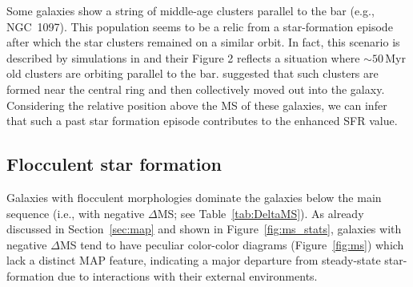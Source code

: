 \documentclass[linenumbers]{aastex63}
\begin{document}
Some galaxies show a string of middle-age clusters parallel to the bar (e.g., NGC~1097). This population seems to be a relic from a star-formation episode after which the star clusters remained on a similar orbit. In fact, this scenario is described by simulations in \citet{dobbs_age_2010} and their Figure 2 reflects a situation where $\sim50$\,Myr old clusters are orbiting parallel to the bar. \citet{sormani_simulations_2020} suggested that such clusters are formed near the central ring and then collectively moved out into the galaxy. %
Considering the relative position above the MS of these galaxies, we can infer that such a past star formation episode contributes to the enhanced SFR value.


\subsection{Flocculent star formation} \label{sect:flocculent}


Galaxies with flocculent morphologies dominate the galaxies below the main sequence (i.e., with negative $\Delta$MS; see Table~\ref{tab:DeltaMS}). As already discussed in Section~\ref{sec:map} and shown in Figure~\ref{fig:ms_stats}, galaxies with negative $\Delta$MS tend to have peculiar color-color diagrams (Figure~\ref{fig:ms}) which lack a distinct MAP feature, indicating a major departure from steady-state star-formation due to interactions with their external environments. 
\end{document}
